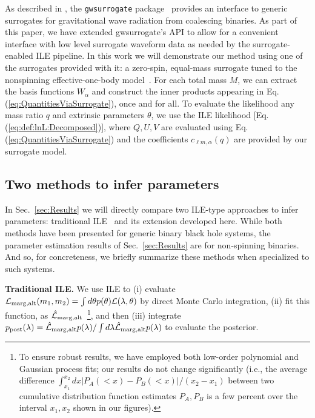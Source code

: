 \documentclass[aps,prd,nofootinbib,showpacs,amssymb,twocolumn]{revtex4}
\newcommand\ILE{ILE}
\begin{document}
%
%
%
%
%
%
%
%
%
%
%
%
%
%
%
%
%
%
%
%
%
%
%
%
%




%
As described in \cite{2014PhRvX...4c1006F}, the  \texttt{gwsurrogate}
package~\cite{gwsurrogate} provides an interface to generic surrogates for gravitational wave
radiation from coalescing binaries.  As part of this paper, we have extended gwsurrogate's API to allow for a convenient 
interface with low level surrogate waveform data as needed by the surrogate-enabled ILE pipeline.  In this work we will demonstrate our method 
using one of the surrogates provided with it: a zero-spin, equal-mass
surrogate   tuned to the nonspinning effective-one-body model~\cite{pan2011inspiral}. For each total mass
$M$,  we can extract the basis functions  $W_\alpha$ and construct the inner products appearing in
Eq. (\ref{eq:QuantitiesViaSurrogate}), once and for all.   To evaluate the likelihood any mass ratio $q$ and extrinsic
parameters $\theta$, we use the   \ILE{} likelihood [Eq. (\ref{eq:def:lnL:Decomposed})], where 
 $Q,U,V$ are evaluated using Eq. (\ref{eq:QuantitiesViaSurrogate}) and the coefficients $c_{\ell m,\alpha}(q)$ are provided by our surrogate model.  



\subsection{Two methods to infer parameters}
%
\label{sec:sub:Implementation}
%
%


In Sec.~\ref{sec:Results} we will directly compare two ILE-type
%
approaches
to infer parameters: traditional ILE~\cite{gwastro-PE-AlternativeArchitectures}
and its extension developed here.
While both methods have been presented for generic binary 
black hole systems, the parameter estimation results of Sec.~\ref{sec:Results}
are for non-spinning binaries. And so, for concreteness, 
we briefly summarize these methods when specialized to such systems.

%

\noindent \textbf{Traditional ILE.} 
%
We use ILE to (i) evaluate ${\cal L}_{\rm marg,alt}(m_1,m_2) = \int d\theta
p(\theta){\cal L}(\lambda,\theta)$ by direct Monte Carlo integration,
%
%
(ii) fit this function, as $\hat{\cal L}_{\rm marg,alt}$~\footnote{To ensure robust results, we have employed both  low-order polynomial and Gaussian process fits; our
  results do not change significantly (i.e., the average difference $\int_{x_1}^{x_2} dx |P_A(<x) -
    P_B(<x)|/(x_2-x_1)$ between  two cumulative distribution function estimates $P_A,P_B$ is a few percent over the
    interval $x_1,x_2$ shown in our figures). },
%
and then (iii) integrate  $p_{\rm post}(\lambda)= \hat{{\cal
  L}}_{\rm marg,alt} p(\lambda)/\int d \lambda  \hat{{\cal
  L}}_{\rm marg,alt} p(\lambda)$ to evaluate the posterior. 
\end{document}
